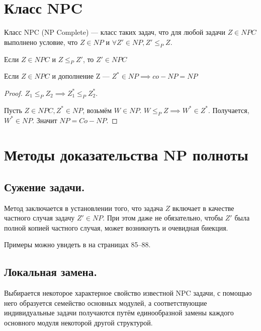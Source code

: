 \section{Класс NPC}
\begin{definition}
	Класс NPC (NP Complete) --- класс таких задач, что для любой задачи
	$Z\in NPC$ выполнено условие, что $Z\in NP$ и $\forall Z'\in NP, Z'
	\le_P Z$.
\end{definition}

\begin{lemma}
	Если $Z\in NPC$ и  $Z \le_P Z'$, то  $Z' \in NPC$
\end{lemma}



\begin{theorem}
	Если $Z \in NPC$ и дополнение Z ---  $Z^* \in NP \implies co-NP = NP$
\end{theorem}
\begin{proof}
	$Z_1 \le_P Z_2 \implies Z_1^* \le_P Z_2^*$.

	Пусть $Z \in NPC, Z^* \in NP$, возьмём  $W \in NP $. $W \le_P Z
	\implies W^* \in Z^*$. Получается, $W^* \in NP$. Значит  $NP = Co-NP.$
\end{proof}
\section{Методы доказательства NP полноты}

\subsection*{Сужение задачи.}
Метод заключается в установлении того, что задача $Z$ включает в качестве частного случая задачу $Z' \in NP$. При этом даже не обязательно, чтобы $Z'$ была полной копией частного случая, может возникнуть и очевидная биекция. 

Примеры можно увидеть в \cite{Geri} на страницах 85--88.

\subsection*{Локальная замена.}

Выбирается некоторое характерное свойство известной NPC задачи, с помощью него образуется семейство основных модулей, а соответствующие индивидуальные задачи получаются путём единообразной замены каждого основного модуля некоторой другой структурой. 

